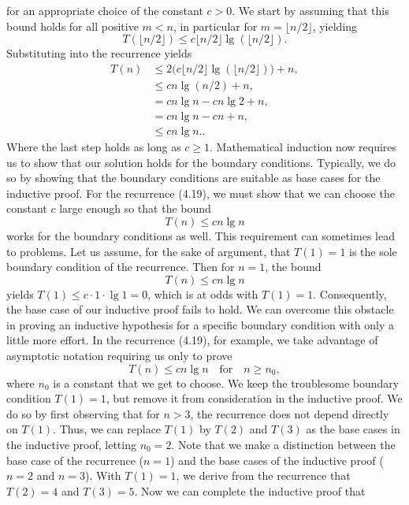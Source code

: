 \documentclass{report}
\begin{document}
        for an appropriate choice of the constant \( c > 0 \). We start by assuming
        that this bound holds for all positive \( m < n \), in particular for \( m = \lfloor n/2 \rfloor \), yielding
        \[ T(\lfloor n/2 \rfloor) \leq c \lfloor n/2 \rfloor \lg(\lfloor n/2 \rfloor). \]
        Substituting into the recurrence yields
        \begin{align*}
            T(n) &\leq 2 \big(c \lfloor n/2 \rfloor \lg(\lfloor n/2 \rfloor)\big) + n, \\
            &\leq c n \lg(n/2) + n, \\
            &= c n \lg n - c n \lg 2 + n, \\
            &= c n \lg n - c n + n, \\
            &\leq c n \lg n.
        .\end{align*}
        \bigbreak \noindent 
        Where the last step holds as long as $c \geq 1$. 
        \bigbreak \noindent 
        Mathematical induction now requires us to show that our solution holds for the boundary conditions. Typically, we do so by showing that the boundary conditions are suitable as base cases for the inductive proof. For the recurrence (4.19), we must show that we can choose the constant \( c \) large enough so that the bound 
        \[
            T(n) \leq c n \lg n
        \]
        works for the boundary conditions as well. This requirement can sometimes lead to problems. Let us assume, for the sake of argument, that \( T(1) = 1 \) is the sole boundary condition of the recurrence. Then for \( n = 1 \), the bound 
        \[
            T(n) \leq c n \lg n
        \]
        yields \( T(1) \leq c \cdot 1 \cdot \lg 1 = 0 \), which is at odds with \( T(1) = 1 \). Consequently, the base case of our inductive proof fails to hold.
        \bigbreak \noindent 
        We can overcome this obstacle in proving an inductive hypothesis for a specific boundary condition with only a little more effort. In the recurrence (4.19), for example, we take advantage of asymptotic notation requiring us only to prove 
        \[
            T(n) \leq c n \lg n \quad \text{for} \quad n \geq n_0,
        \]
        where \( n_0 \) is a constant that we get to choose. We keep the troublesome boundary condition \( T(1) = 1 \), but remove it from consideration in the inductive proof. We do so by first observing that for \( n > 3 \), the recurrence does not depend directly on \( T(1) \). Thus, we can replace \( T(1) \) by \( T(2) \) and \( T(3) \) as the base cases in the inductive proof, letting \( n_0 = 2 \). Note that we make a distinction between the base case of the recurrence (\( n = 1 \)) and the base cases of the inductive proof (\( n = 2 \) and \( n = 3 \)). With \( T(1) = 1 \), we derive from the recurrence that \( T(2) = 4 \) and \( T(3) = 5 \). Now we can complete the inductive proof that 
\end{document}
